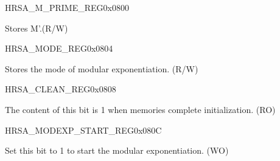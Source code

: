 

\begin{register}{H}{RSA\_M\_PRIME\_REG}{0x0800}\label{regdesc:RSAMPRIMEREG}
%
\regnewline%
\begin{regdesc}\begin{reglist}
\item [RSA\_M\_PRIME\_REG] Stores M'.(R/W)
\end{reglist}\end{regdesc}
\end{register}


\begin{register}{H}{RSA\_MODE\_REG}{0x0804}\label{regdesc:RSAMODEXPMODEREG}
%
%
\regnewline%
\begin{regdesc}\begin{reglist}
\item [RSA\_MODE] Stores the mode of modular exponentiation. (R/W)
\end{reglist}\end{regdesc}
\end{register}



\begin{register}{H}{RSA\_CLEAN\_REG}{0x0808}\label{regdesc:RSACLEANREG}
%
%
\regnewline%
\begin{regdesc}\begin{reglist}
\item [RSA\_CLEAN] The content of this bit is 1 when memories complete initialization. (RO)
\end{reglist}\end{regdesc}
\end{register}


\begin{register}{H}{RSA\_MODEXP\_START\_REG}{0x080C}\label{regdesc:RSAMODEXPSTARTREG}
%
%
\regnewline%
\begin{regdesc}\begin{reglist}
\item [RSA\_MODEXP\_START] Set this bit to 1 to start the modular exponentiation. (WO)
\end{reglist}\end{regdesc}
\end{register}


